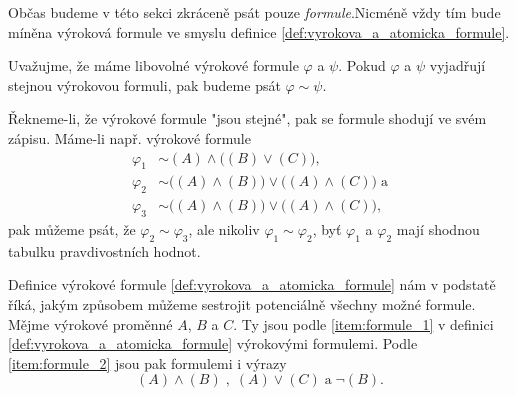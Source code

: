 \begin{remark}
    Občas budeme v této sekci zkráceně psát pouze \emph{formule}.\linebreak Nicméně vždy tím bude míněna výroková formule ve smyslu definice \ref{def:vyrokova_a_atomicka_formule}.
\end{remark}

\begin{convention}
    \label{conv:rovnost_logickych_formuli}
    Uvažujme, že máme libovolné výrokové formule $\varphi$ a $\psi$. Pokud $\varphi$ a $\psi$ vyjadřují stejnou výrokovou formuli, pak budeme psát $\varphi\sim\psi$.
\end{convention}

Řekneme-li, že výrokové formule "jsou stejné", pak se formule shodují ve svém zápisu. Máme-li např. výrokové formule
\begin{align*}
    \varphi_1&\sim (A) \land \big((B) \lor (C)\big),\\
    \varphi_2&\sim \big((A) \land (B)\big) \lor \big((A) \land (C)\big )\;\text{a}\\
    \varphi_3&\sim \big((A) \land (B)\big) \lor \big((A) \land (C)\big),
\end{align*}
pak můžeme psát, že $\varphi_2\sim\varphi_3$, ale nikoliv $\varphi_1\sim\varphi_2$, byť $\varphi_1$ a $\varphi_2$ mají shodnou tabulku pravdivostních hodnot.\par

Definice výrokové formule \ref{def:vyrokova_a_atomicka_formule} nám v podstatě říká, jakým způsobem můžeme sestrojit potenciálně všechny možné formule. Mějme výrokové proměnné $A$, $B$ a $C$. Ty jsou podle \ref{item:formule_1} v definici \ref{def:vyrokova_a_atomicka_formule} výrokovými formulemi. Podle \ref{item:formule_2} jsou pak formulemi i výrazy
\begin{equation}\label{eq:vyrokove_formule_z_definice}
    (A) \land (B)\;,\;(A) \lor (C)\;\text{a}\;\neg(B).
\end{equation}

